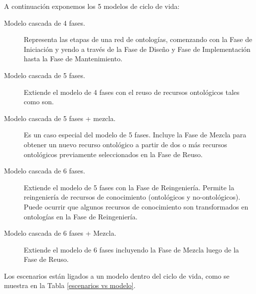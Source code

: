 A continuación exponemos los 5 modelos de ciclo de vida:	

\begin{description}
    \item[Modelo cascada de 4 fases.] Representa las etapas de una red de ontologías, comenzando con la Fase de Iniciación y yendo a través de la Fase de Diseño y Fase de Implementación hasta la Fase de Mantenimiento.
    \item[Modelo cascada de 5 fases.] Extiende el modelo de 4 fases con el reuso de recursos  ontológicos tales como son.
    \item[Modelo cascada de 5 fases + mezcla.] Es un caso especial del modelo de 5 fases. Incluye la Fase de Mezcla para obtener un nuevo recurso ontológico a partir de dos o más recursos ontológicos previamente seleccionados en la Fase de Reuso.
    \item[Modelo cascada de 6 fases.] Extiende el modelo de 5 fases con la Fase de Reingeniería. Permite la reingeniería de recursos de conocimiento (ontológicos y no-ontológicos). Puede ocurrir que algunos recursos de conocimiento son transformados en ontologías en la Fase de Reingeniería.
    \item[Modelo cascada de 6 fases + Mezcla.] Extiende el modelo de 6 fases incluyendo la Fase de Mezcla luego de la Fase de Reuso.
\end{description}

Los escenarios están ligados a un modelo dentro del ciclo de vida, como se muestra en la Tabla \ref{escenarios vs modelo}.

